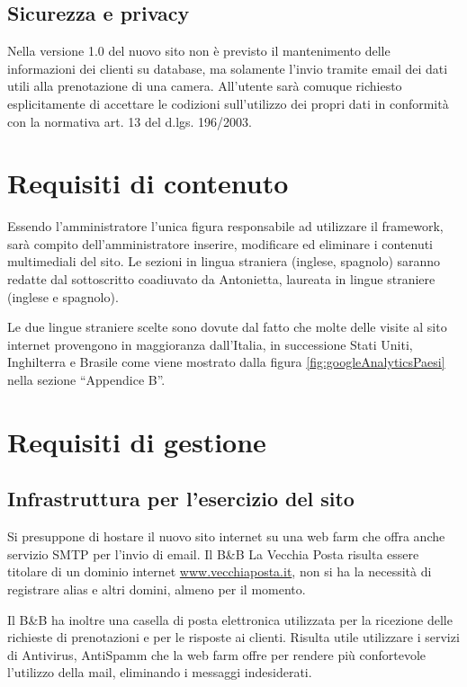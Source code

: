 \documentclass[a4paper,12pt,hidelinks]{report}
\begin{document}
  \subsection{Sicurezza e privacy}
  Nella versione 1.0 del nuovo sito non è previsto il mantenimento delle informazioni dei clienti su database, ma solamente l'invio tramite email dei dati utili alla prenotazione di una camera.
  All'utente sarà comuque richiesto esplicitamente di accettare le codizioni sull'utilizzo dei propri dati in conformità con la normativa art. 13 del d.lgs. 196/2003.

\section{Requisiti di contenuto}
Essendo l'amministratore l'unica figura responsabile ad utilizzare il framework, sarà compito dell'amministratore inserire, modificare ed eliminare i contenuti multimediali del sito.
Le sezioni in lingua straniera (inglese, spagnolo) saranno redatte dal sottoscritto coadiuvato da Antonietta, laureata in lingue straniere (inglese e spagnolo).
\par Le due lingue straniere scelte sono dovute dal fatto che molte delle visite al sito internet provengono in maggioranza dall'Italia, in successione Stati Uniti, Inghilterra e Brasile come viene mostrato
dalla figura \ref{fig:googleAnalyticsPaesi} nella sezione ``Appendice B''.

\section{Requisiti di gestione}

  \subsection{Infrastruttura per l'esercizio del sito}
  Si presuppone di hostare il nuovo sito internet su una web farm che offra anche servizio SMTP per l'invio di email. 
  Il B\&B La Vecchia Posta risulta essere titolare di un dominio internet \url{www.vecchiaposta.it},
  non si ha la necessità di registrare alias e altri domini, almeno per il momento.
  \par Il B\&B ha inoltre una casella di posta elettronica utilizzata per la ricezione delle richieste di prenotazioni e per le risposte ai clienti. 
  Risulta utile utilizzare i servizi di Antivirus, AntiSpamm che la web farm offre per rendere più confortevole l'utilizzo della mail, eliminando i 
  messaggi indesiderati.
  
\end{document}
